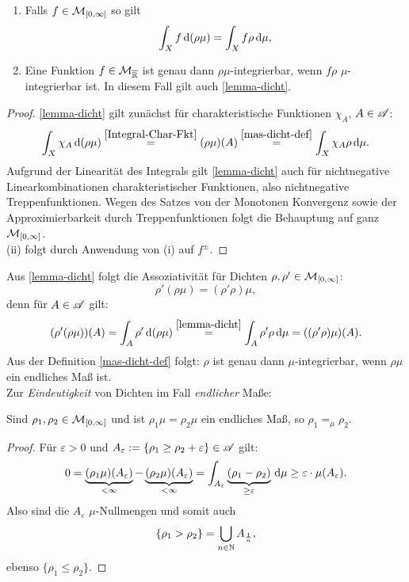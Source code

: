 \begin{lemma}
\begin{mdframed}
\begin{enumerate}
\item Falls $f\in \MM_{[0,\infty]}$ so gilt
\begin{equation} \label{lemma-dicht}
\int_X f\D (\rho\mu)=\int_X f\rho \D \mu,
\end{equation}
\item Eine Funktion $f\in\MM_{\ol\R}$ ist genau dann $\rho\mu$-integrierbar, wenn $f\rho$ $\mu$-integrierbar ist. In diesem Fall gilt auch \eqref{lemma-dicht}.
\end{enumerate}
\end{mdframed}
\begin{proof}
\eqref{lemma-dicht} gilt zunächst für charakteristische Funktionen $\chi_A$, $A\in\AA$:
$$
\int_X \chi_A \D(\rho \mu) \overset{\eqref{Integral-Char-Fkt}}= (\rho\mu)(A) \overset{\eqref{mas-dicht-def}}= \int_X \chi_A \rho \D\mu.
$$
Aufgrund der Linearität des Integrals gilt \eqref{lemma-dicht} auch für nichtnegative Linearkombinationen charakteristischer Funktionen, also nichtnegative Treppenfunktionen. Wegen des Satzes von der Monotonen Konvergenz sowie der Approximierbarkeit durch Treppenfunktionen folgt die Behauptung auf ganz $\MM_{[0,\infty]}$.\vspace{0.3pc}\\
(ii) folgt durch Anwendung von (i) auf $f^\pm$. 
\end{proof}
\end{lemma}
Aus \eqref{lemma-dicht} folgt die Assoziativität für Dichten $\rho,\rho' \in \MM_{[0,\infty]}$:
$$\rho'(\rho\mu)=(\rho'\rho)\mu,$$
denn für $A\in\AA$ gilt:
$$
(\rho'(\rho\mu))(A)=\int_A\rho'\D(\rho\mu) \overset{\eqref{lemma-dicht}}= \int_A\rho'\rho\D\mu = ((\rho'\rho)\mu)(A).
$$
Aus der Definition \eqref{mas-dicht-def} folgt: $\rho$ ist genau dann $\mu$-integrierbar, wenn $\rho\mu$ ein endliches Maß ist. \vspace{0.5pc}\\
Zur \emph{Eindeutigkeit} von Dichten im Fall \emph{endlicher} Maße:
\begin{lemma}
\begin{mdframed}
Sind $\rho_1,\rho_2 \in \MM_{[0,\infty]}$ und ist $\rho_1\mu=\rho_2\mu$ ein endliches Maß, so $\rho_1=_\mu \rho_2$.
\end{mdframed}
\begin{proof}
Für $\varepsilon>0$ und $A_\varepsilon:=\{\rho_1 \geq \rho_2 + \varepsilon\} \in \AA$ gilt:
$$0= \underbrace{(\rho_1 \mu)(A_\varepsilon)}_{<\infty}- \underbrace{(\rho_2\mu)(A_\varepsilon)}_{<\infty} = \int_{A_\varepsilon} \underbrace{(\rho_1-\rho_2)}_{\geq \varepsilon}\D \mu \geq \varepsilon\cdot \mu(A_\varepsilon).$$
Also sind die $A_\varepsilon$ $\mu$-Nullmengen und somit auch $$\{\rho_1>\rho_2\}=\bigcup_{n\in\N}A_{\frac{1}{n}},$$
ebenso $\{\rho_1 \leq \rho_2\}$.
\end{proof}
\end{lemma}
